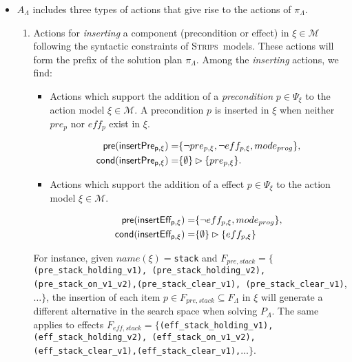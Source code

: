 \documentclass[runningheads]{llncs}
\newcommand{\pre}{\mathsf{pre}}     %
\newcommand{\cond}{\mathsf{cond}}   %
\newcommand{\strips}{\textsc{Strips}}     %
\begin{document}
\begin{itemize}
\item $A_{\Lambda}$ includes three types of actions that give rise to the actions of $\pi_\Lambda$.
\begin{enumerate}
\item Actions for {\em inserting} a component (precondition or effect) in $\xi \in \mathcal{M}$ following the syntactic constraints of \strips\ models. These actions will form the prefix of the solution plan $\pi_\Lambda$. Among the \emph{inserting} actions, we find:
\begin{itemize}
\item Actions which support the addition of a {\em precondition} $p\in \Psi_{\xi}$ to the action model $\xi\in\mathcal{M}$. A precondition $p$ is inserted in $\xi$ when neither $pre_p$ nor $eff_p$ exist in $\xi$.
\begin{small}
\begin{align*}
\hspace*{7pt}\pre(\mathsf{insertPre_{p,\xi}})=&\{\neg pre_{p,\xi}, \neg eff_{p,\xi}, mode_{prog}\},\\
\cond(\mathsf{insertPre_{p,\xi}})=&\{\emptyset\}\rhd\{pre_{p,\xi}\}.
\end{align*}
\end{small}

\item Actions which support the addition of a effect $p\in \Psi_{\xi}$ to the action model $\xi\in\mathcal{M}$. 
\begin{small}
\begin{align*}
\hspace*{7pt}\pre(\mathsf{insertEff_{p,\xi}})=&\{\neg eff_{p,\xi}, mode_{prog}\},\\
\cond(\mathsf{insertEff_{p,\xi}})=&\{\emptyset\}\rhd\{eff_{p,\xi}\}
\end{align*}
\end{small}
\end{itemize}

For instance, given $name(\xi)=${\tt{\small stack}} and $F_{pre,stack}=\{${\tt{\small (pre\_stack\_holding\_v1),} {\tt\small (pre\_stack\_holding\_v2), (pre\_stack\_on\_v1\_v2),(pre\_stack\_clear\_v1)}, {\tt\small(pre\_stack\_clear\_v1)}}, $\ldots \}$, the insertion of each item $p \in F_{pre,stack}\subseteq F_{\Lambda}$ in $\xi$ will generate a different alternative in the search space when solving $P_{\Lambda}$. The same applies to effects $F_{eff,stack}=\{${\tt{\small (eff\_stack\_holding\_v1),(eff\_stack\_holding\_v2), (eff\_stack\_on\_v1\_v2),(eff\_stack\_clear\_v1),(eff\_stack\_clear\_v1),}}$\ldots \}$.


\end{enumerate}
\end{itemize}
\end{document}
